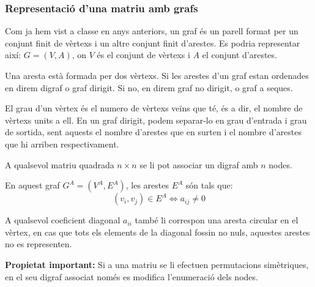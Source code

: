 \documentclass[8pt]{beamer}
\begin{document}
\begin{frame}
  \frametitle{Representació d'una matriu amb grafs}
  
Com ja hem vist a classe en anys anteriors, un graf és un parell format per un conjunt finit de vèrtexs i un altre conjunt finit d'arestes. Es podria representar així: $G = (V,A)$, on $V$ és el conjunt de vèrtexs i $A$ el conjunt d'arestes.

Una aresta està formada per dos vèrtexs. Si les arestes d'un graf estan ordenades en direm digraf o graf dirigit. Si no, en direm graf no dirigit, o graf a seques.

El grau d'un vèrtex és el numero de vèrtexs veïns que té, és a dir, el nombre de vèrtexs units a ell. En un graf dirigit, podem separar-lo en grau d'entrada i grau de sortida, sent aquests el nombre d'arestes que en surten i el nombre d'arestes que hi arriben respectivament.


A qualsevol matriu quadrada $n \times n$ se li pot associar un digraf amb $n$ nodes.

En aquest graf $G^A = (V^A, E^A)$, les arestes $E^A$ són tals que:
\[(v_i,v_j) \in E^A \Leftrightarrow	a_{ij} \neq 0\]

A qualsevol coeficient diagonal $a_{ii}$ també li correspon una aresta circular en el vèrtex, en cas que tots els elements de la diagonal fossin no nuls, aquestes arestes no es representen.


\textbf{Propietat important: }Si a una matriu se li efectuen permutacions simètriques, en el seu digraf associat només es modifica l'enumeració dels nodes.

\end{frame}
\end{document}
